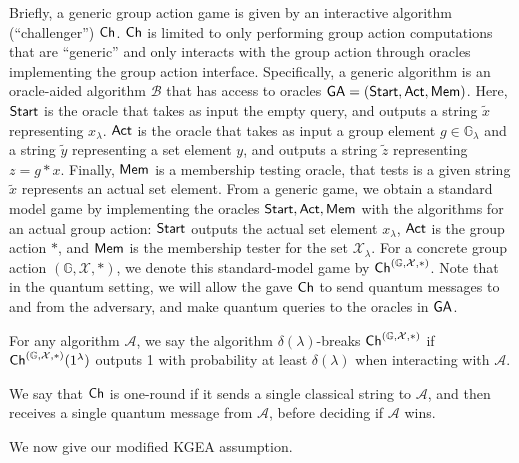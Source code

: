 \documentclass{article}\usepackage[a4paper,margin=20mm]{geometry}
\numberwithin{theorem}{section}
\numberwithin{equation}{section}
\newcommand{\G}{\mathbb{G}}
\newcommand{\As}{{\mathcal{A}}}
\newcommand{\Bs}{{\mathcal{B}}}
\newcommand{\Xs}{{\mathcal{X}}}
\begin{document}
Briefly, a generic group action game is given by an interactive algorithm (``challenger'') ${\sf Ch}$. ${\sf Ch}$ is limited to only performing group action computations that are ``generic'' and only interacts with the group action through oracles implementing the group action interface. Specifically, a generic algorithm is an oracle-aided algorithm $\Bs$ that has access to oracles ${\sf GA}=({\sf Start},{\sf Act},{\sf Mem})$. Here, ${\sf Start}$ is the oracle that takes as input the empty query, and outputs a string $\tilde{x}$ representing $x_\lambda$. ${\sf Act}$ is the oracle that takes as input a group element $g\in\G_\lambda$ and a string $\tilde{y}$ representing a set element $y$, and outputs a string $\tilde{z}$ representing $z=g*x$. Finally, ${\sf Mem}$ is a membership testing oracle, that tests is a given string $\tilde{x}$ represents an actual set element. From a generic game, we obtain a standard model game by implementing the oracles ${\sf Start},{\sf Act},{\sf Mem}$ with the algorithms for an actual group action: ${\sf Start}$ outputs the actual set element $x_\lambda$, ${\sf Act}$ is the group action $*$, and ${\sf Mem}$ is the membership tester for the set $\Xs_\lambda$. For a concrete group action $(\G,\Xs,*)$, we denote this standard-model game by ${\sf Ch}^{(\G,\Xs,*)}$. Note that in the quantum setting, we will allow the gave ${\sf Ch}$ to send quantum messages to and from the adversary, and make quantum queries to the oracles in ${\sf GA}$.


For any algorithm $\As$, we say the algorithm $\delta(\lambda)$-breaks ${\sf Ch}^{(\G,\Xs,*)}$ if ${\sf Ch}^{(\G,\Xs,*)}(1^\lambda)$ outputs 1 with probability at least $\delta(\lambda)$ when interacting with $\As$.

We say that ${\sf Ch}$ is one-round if it sends a single classical string to $\As$, and then receives a single quantum message from $\As$, before deciding if $\As$ wins.

\medskip

We now give our modified KGEA assumption.
\end{document}
